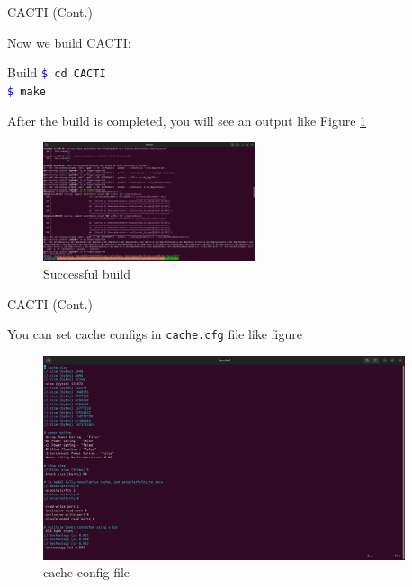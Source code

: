 \documentclass{beamer}
\begin{document}
\begin{frame}{CACTI (Cont.)}
	
	Now we build CACTI:
	
	\begin{block}{Build}
		\texttt{\textcolor{blue}{\$} cd CACTI}\\
		\texttt{\textcolor{blue}{\$} make}\\
	\end{block}
	
	After the build is completed, you will see an output like Figure \textcolor{blue}{\ref{fig:Successful build}}
	
	\begin{figure}
		\centering
		\includegraphics[height=3.5cm]{images/img3}
			\caption{Successful build}
		\label{fig:Successful build}
	\end{figure}
	
	
\end{frame}


\begin{frame}{CACTI (Cont.)}
	
	You can set cache configs in \texttt{cache.cfg} file like figure 

	
	\begin{figure}
		\centering
		\includegraphics[height=6cm]{images/img4}
		\caption{cache config file}
		\label{fig:cache config file}
	\end{figure}
	
\end{frame}
\end{document}
